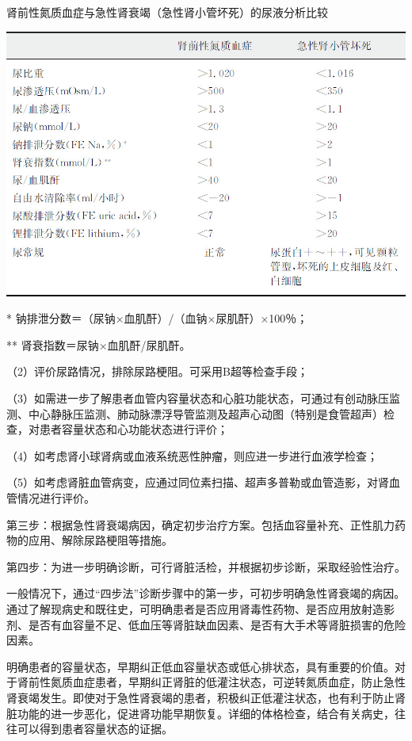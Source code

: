 \begin{table}[htbp]
{\centering
\caption{肾前性氮质血症与急性肾衰竭（急性肾小管坏死）的尿液分析比较}
\label{tab11-3}
\includegraphics{./images/Image00090.jpg}}

\footnotesize
* 钠排泄分数＝（尿钠×血肌酐）/（血钠×尿肌酐）×100％；

** 肾衰指数＝尿钠×血肌酐/尿肌酐。
\end{table}



（2）评价尿路情况，排除尿路梗阻。可采用B超等检查手段；

（3）如需进一步了解患者血管内容量状态和心脏功能状态，可通过有创动脉压监测、中心静脉压监测、肺动脉漂浮导管监测及超声心动图（特别是食管超声）检查，对患者容量状态和心功能状态进行评价；

（4）如考虑肾小球肾病或血液系统恶性肿瘤，则应进一步进行血液学检查；

（5）如考虑肾脏血管病变，应通过同位素扫描、超声多普勒或血管造影，对肾血管情况进行评价。

第三步：根据急性肾衰竭病因，确定初步治疗方案。包括血容量补充、正性肌力药物的应用、解除尿路梗阻等措施。

第四步：为进一步明确诊断，可行肾脏活检，并根据初步诊断，采取经验性治疗。

一般情况下，通过“四步法”诊断步骤中的第一步，可初步明确急性肾衰竭的病因。通过了解现病史和既往史，可明确患者是否应用肾毒性药物、是否应用放射造影剂、是否有血容量不足、低血压等肾脏缺血因素、是否有大手术等肾脏损害的危险因素。

明确患者的容量状态，早期纠正低血容量状态或低心排状态，具有重要的价值。对于肾前性氮质血症患者，早期纠正肾脏的低灌注状态，可逆转氮质血症，防止急性肾衰竭发生。即使对于急性肾衰竭的患者，积极纠正低灌注状态，也有利于防止肾脏功能的进一步恶化，促进肾功能早期恢复。详细的体格检查，结合有关病史，往往可以得到患者容量状态的证据。


